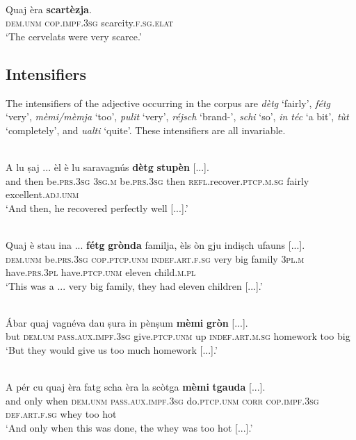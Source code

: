 \ea
\label{}
\\
\gll Quaj èra \textbf{scartèzja}.   \\
\textsc{dem.unm} \textsc{cop.impf.3sg} scarcity.\textsc{f.sg.elat}\\
\glt `The cervelats were very scarce.'
\z

\subsection{Intensifiers}
The intensifiers of the adjective occurring in the corpus are \textit{dètg} `fairly', \textit{fétg} `very', \textit{mèmi/mèmja} `too', \textit{pulit} `very', \textit{réjsch} `brand-', \textit{schi} `so', \textit{in téc} `a bit', \textit{tùt} `completely', and \textit{ualti} `quite'. These intensifiers are all invariable.

\ea
\label{}
\\
\gll A lu ṣaj ... èl è lu saravagnús \textbf{dètg} \textbf{stupèn} [...].   \\
and then be.\textsc{prs.3sg} {} \textsc{3sg.m} be.\textsc{prs.3sg} then \textsc{refl}.recover.\textsc{ptcp.m.sg} fairly  excellent.\textsc{adj.unm}\\
\glt `And then, he recovered perfectly well [...].'
\z

\ea
\label{}
\\
\gll Quaj è stau ina ... \textbf{fétg} \textbf{grònda} familja, èls òn gju indiṣch ufauns [...].   \\
\textsc{dem.unm}  be.\textsc{prs.3sg}  \textsc{cop.ptcp.unm} \textsc{indef.art.f.sg} {} very big family \textsc{3pl.m} have.\textsc{prs.3pl} have.\textsc{ptcp.unm} eleven child.\textsc{m.pl}\\
\glt `This was a ... very big family, they had eleven children [...].'
\z

\ea
\label{}
\\
\gll  Ábar quaj vagnéva dau ṣura in pènṣum \textbf{mèmi} \textbf{gròn} [...].  \\
but \textsc{dem.um} \textsc{pass.aux.impf.3sg} give.\textsc{ptcp.unm} up \textsc{indef.art.m.sg} homework too big\\
\glt `But they would give us too much homework [...].'
\z

\ea
\label{}
\\
	\gll  A pér cu quaj èra fatg scha èra la scòtga \textbf{mèmi} \textbf{tgauda} [...].  \\
and only when \textsc{dem.unm} \textsc{pass.aux.impf.3sg} do.\textsc{ptcp.unm} \textsc{corr} \textsc{cop.impf.3sg} \textsc{def.art.f.sg} whey too hot\\
\glt `And only when this was done, the whey was too hot [...].'
\z

